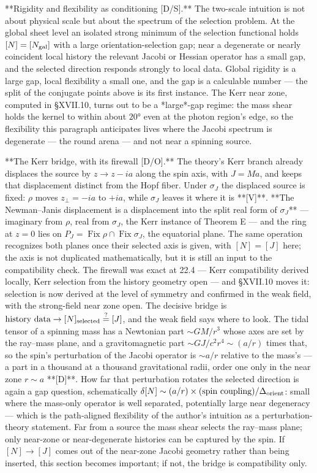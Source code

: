 **Rigidity and flexibility as conditioning [D/S].** The two-scale intuition is not about physical scale but about the spectrum of the selection problem. At the global sheet level an isolated strong minimum of the selection functional holds $[N] = [N_{\rm gal}]$ with a large orientation-selection gap; near a degenerate or nearly coincident local history the relevant Jacobi or Hessian operator has a small gap, and the selected direction responds strongly to local data. Global rigidity is a large gap, local flexibility a small one, and the gap is a calculable number — the split of the conjugate points above is its first instance. The Kerr near zone, computed in §XVII.10, turns out to be a *large*-gap regime: the mass shear holds the kernel to within about $20°$ even at the photon region's edge, so the flexibility this paragraph anticipates lives where the Jacobi spectrum is degenerate — the round arena — and not near a spinning source.

**The Kerr bridge, with its firewall [D/O].** The theory's Kerr branch already displaces the source by $z\to z-ia$ along the spin axis, with $J = Ma$, and keeps that displacement distinct from the Hopf fiber. Under $\sigma_J$ the displaced source is fixed: $\rho$ moves $z_\perp = -ia$ to $+ia$, while $\sigma_J$ leaves it where it is **[V]**. **The Newman–Janis displacement is a displacement into the split real form of $\sigma_J$** — imaginary from $\rho$, real from $\sigma_J$, the Kerr instance of Theorem E — and the ring at $z = 0$ lies on $P_J = \operatorname{Fix}\rho\cap\operatorname{Fix}\sigma_J$, the equatorial plane. The same operation recognizes both planes once their selected axis is given, with $[N] = [J]$ here; the axis is not duplicated mathematically, but it is still an input to the compatibility check. The firewall was exact at 22.4 — Kerr compatibility derived locally, Kerr selection from the history geometry open — and §XVII.10 moves it: selection is now derived at the level of symmetry and confirmed in the weak field, with the strong-field near zone open. The decisive bridge is $\text{history data}\to[N]_{\rm selected}\overset{?}{=}[J]$, and the weak field says where to look. The tidal tensor of a spinning mass has a Newtonian part $\sim GM/r^3$ whose axes are set by the ray–mass plane, and a gravitomagnetic part $\sim GJ/c^2r^4\sim(a/r)$ times that, so the spin's perturbation of the Jacobi operator is $\sim a/r$ relative to the mass's — a part in a thousand at a thousand gravitational radii, order one only in the near zone $r\sim a$ **[D]**. How far that perturbation rotates the selected direction is again a gap question, schematically $\delta[N]\sim(a/r)\times(\text{spin coupling})/\Delta_{\rm orient}$: small where the mass-only operator is well separated, potentially large near degeneracy — which is the path-aligned flexibility of the author's intuition as a perturbation-theory statement. Far from a source the mass shear selects the ray–mass plane; only near-zone or near-degenerate histories can be captured by the spin. If $[N]\to[J]$ comes out of the near-zone Jacobi geometry rather than being inserted, this section becomes important; if not, the bridge is compatibility only.

